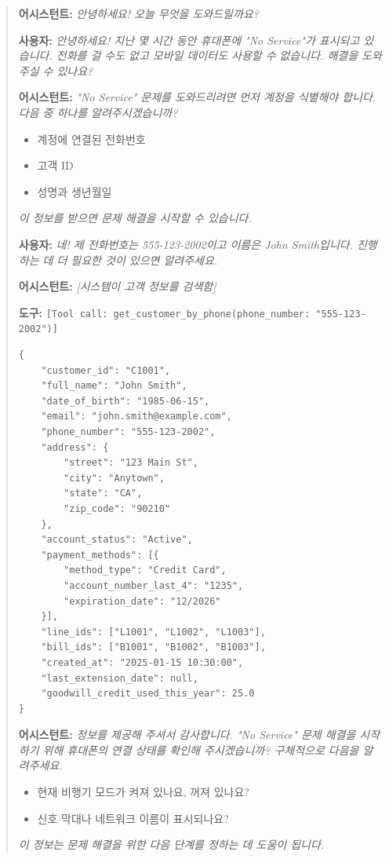 \begin{quote}
\noindent\textbf{어시스턴트:} \textit{안녕하세요! 오늘 무엇을 도와드릴까요?}

\vspace{0.5em}
\noindent\textbf{사용자:} \textit{안녕하세요! 지난 몇 시간 동안 휴대폰에 "No Service"가 표시되고 있습니다. 전화를 걸 수도 없고 모바일 데이터도 사용할 수 없습니다. 해결을 도와주실 수 있나요?}

\vspace{0.5em}
\noindent\textbf{어시스턴트:} \textit{"No Service" 문제를 도와드리려면 먼저 계정을 식별해야 합니다. 다음 중 하나를 알려주시겠습니까?}
\begin{itemize}[leftmargin=*]
\item 계정에 연결된 전화번호
\item 고객 ID
\item 성명과 생년월일
\end{itemize}
\textit{이 정보를 받으면 문제 해결을 시작할 수 있습니다.}

\vspace{0.5em}
\noindent\textbf{사용자:} \textit{네! 제 전화번호는 555-123-2002이고 이름은 John Smith입니다. 진행하는 데 더 필요한 것이 있으면 알려주세요.}

\vspace{0.5em}
\noindent\textbf{어시스턴트:} \textit{[시스템이 고객 정보를 검색함]}

\vspace{0.5em}
\noindent\textbf{도구:} \texttt{[Tool call: get\_customer\_by\_phone(phone\_number: "555-123-2002")]}

\begin{verbatim}
{
    "customer_id": "C1001",
    "full_name": "John Smith",
    "date_of_birth": "1985-06-15",
    "email": "john.smith@example.com",
    "phone_number": "555-123-2002",
    "address": {
        "street": "123 Main St",
        "city": "Anytown",
        "state": "CA",
        "zip_code": "90210"
    },
    "account_status": "Active",
    "payment_methods": [{
        "method_type": "Credit Card",
        "account_number_last_4": "1235",
        "expiration_date": "12/2026"
    }],
    "line_ids": ["L1001", "L1002", "L1003"],
    "bill_ids": ["B1001", "B1002", "B1003"],
    "created_at": "2025-01-15 10:30:00",
    "last_extension_date": null,
    "goodwill_credit_used_this_year": 25.0
}
\end{verbatim}

\vspace{0.5em}
\noindent\textbf{어시스턴트:} \textit{정보를 제공해 주셔서 감사합니다. "No Service" 문제 해결을 시작하기 위해 휴대폰의 연결 상태를 확인해 주시겠습니까? 구체적으로 다음을 알려주세요.}
\begin{itemize}[leftmargin=*]
\item 현재 비행기 모드가 켜져 있나요, 꺼져 있나요?
\item 신호 막대나 네트워크 이름이 표시되나요?
\end{itemize}
\textit{이 정보는 문제 해결을 위한 다음 단계를 정하는 데 도움이 됩니다.}


\end{quote}
